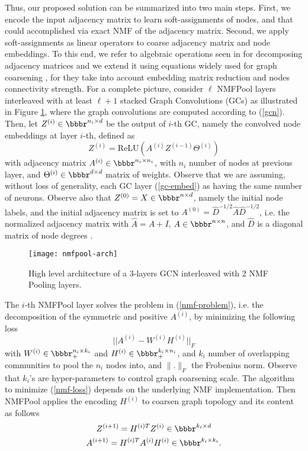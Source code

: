 \documentclass[runningheads]{llncs}
\begin{document}
Thus, our proposed solution can be summarized into two main steps. First, we encode the input adjacency matrix to learn soft-assignments of nodes, and that could accomplished via exact NMF of the adjacency matrix. Second, we apply soft-assignments as linear operators to coarse adjacency matrix and node embeddings.  To this end, we refer to algebraic operations seen in \cite{NIPS2005_2948} for decomposing adjacency matrices and we extend it using equations widely used for graph coarsening \cite{NIPS2018_7729}, for they take into account embedding matrix reduction and nodes connectivity strength. For a complete picture, consider $\ell$ NMFPool layers interleaved with at least $\ell + 1$ stacked Graph Convolutions (GCs) as illustrated in Figure \ref{figArch}, where the graph convolutions are computed according to (\ref{gcn}). Then, let $Z^{(i)} \in \bbbr^{n_{i}\times d}$ be the output of $i$-th GC, namely the convolved node embeddings at layer $i$-th, defined as
\begin{equation}\label{gc-embed}
	Z^{(i)} = \mbox{ReLU}\left( A^{(i)}Z^{(i-1)}\Theta^{(i)} \right)
\end{equation}
with adjacency matrix $A^{(i)}\in\bbbr^{n_i \times n_i}$, with $n_i$ number of nodes at previous layer, and $\Theta^{(i)} \in \bbbr^{d \times d}$ matrix of weights. Observe that we are assuming, without loss of generality, each GC layer (\ref{gc-embed}) as having the same number of neurons. Observe also that $Z^{(0)} = X \in \bbbr^{n\times d}$, namely the initial node labels, and the initial adjacency matrix is set to $A^{(0)} = \hat{D}^{-1/2} \hat{A} \hat{D}^{-1/2}$, i.e. the normalized adjacency matrix with $\hat{A} = A + I$, $A \in \bbbr^{n\times n}$, and $\hat{D}$ is a diagonal matrix of node degrees \cite{DBLP:journals/corr/KipfW16}.
\begin{figure}
\centering
\texttt{[image: nmfpool-arch]}
\caption{High level architecture of a 3-layers GCN interleaved with 2 NMF Pooling layers.} \label{figArch}
\end{figure}

The $i$-th NMFPool layer solves the problem in (\ref{nmf-problem}), i.e. the decomposition of the symmetric and positive $A^{(i)}$, by minimizing the following loss
\begin{equation}\label{nmf-loss}
	|| A^{(i)} - W^{(i)} H^{(i)} ||_{F}
\end{equation}
with $W^{(i)} \in \bbbr_{+}^{n_i\times k_i}$ and $H^{(i)} \in \bbbr_{+}^{k_i \times n_i}$, and $k_i$ number of overlapping communities to pool the $n_i$ nodes into, and $\| . \|_F$ the Frobenius norm. Observe that $k_i$'s are  hyper-parameters to control graph coarsening scale. The algorithm to minimize (\ref{nmf-loss}) depends on the underlying NMF implementation. Then NMFPool applies the encoding $H^{(i)}$ to coarsen graph topology and its content as follows
\begin{equation}\label{nmfpool-application-a}
Z^{(i+1)} = H^{(i)T} Z^{(i)} \in \bbbr^{k_i \times d}
\end{equation}
\begin{equation}\label{nmfpool-application-b}
	A^{(i+1)} = H^{(i)T} A^{(i)} H^{(i)} \in \bbbr^{k_i \times k_i}.
\end{equation}
\end{document}
